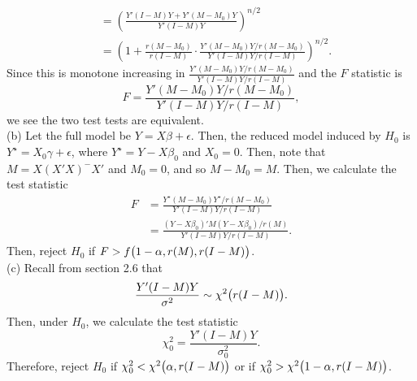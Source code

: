 \documentclass[11pt]{article}
\begin{document}
\begin{itemize}
\begin{align*}
&= \left( \frac{Y'(I-M)Y + Y'(M-M_0)Y}{Y'(I-M)Y} \right)^{n/2} \\
&= \left(1 + \frac{r(M-M_0)}{r(I-M)}\cdot\frac{Y'(M-M_0)Y/r(M-M_0)}{Y'(I-M)Y/r(I-M)}  \right)^{n/2}.
\end{align*}
Since this is monotone increasing in $\frac{Y'(M-M_0)Y/r(M-M_0)}{Y'(I-M)Y/r(I-M)}$ and the $F$ statistic is
\[
F = \frac{Y'(M-M_0)Y/r(M-M_0)}{Y'(I-M)Y/r(I-M)},
\]
we see the two test tests are equivalent. \\ 
(b)  Let the full model be $Y = X\beta + \epsilon$.  Then, the reduced model induced by $H_0$ is $Y^\star = X_0\gamma + \epsilon$, where $Y^\star = Y - X\beta_0$ and $X_0 = 0$.  Then, note that $M = X(X'X)^-X'$ and $M_0 = 0$, and so $M-M_0 = M$. Then, we calculate the test statistic
\begin{align*}
F &= \frac{Y^\star(M-M_0)Y^\star/r(M-M_0)}{Y'(I-M)Y/r(I-M)} \\
&= \frac{(Y-X\beta_0)'M(Y-X\beta_0)/r(M)}{Y'(I-M)Y/r(I-M)}.
\end{align*}
Then, reject $H_0$ if $F > f\big{(}1-\alpha, r(M), r(I-M)\big{)}$. \\
(c)  Recall from section 2.6 that
\[
\frac{Y'(I-M)Y}{\sigma^2} \sim \chi^2\big{(}r(I-M)\big{)}.
\]
Then, under $H_0$, we calculate the test statistic
\[
\chi^2_0 = \frac{Y'(I-M)Y}{\sigma_0^2}.
\]
Therefore, reject $H_0$ if $\chi^2_0 < \chi^2\big{(}\alpha, r(I-M)\big{)}$ or if $\chi^2_0 > \chi^2\big{(}1-\alpha, r(I-M)\big{)}$. 
\end{itemize}
\end{document}
